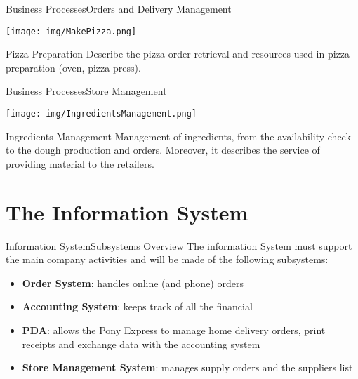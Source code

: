 \documentclass{beamer}
\begin{document}
\begin{frame}{Business Processes}{Orders and Delivery Management}
 \begin{center}
 \texttt{[image: img/MakePizza.png]}
\end{center}
  \begin{block}{Pizza Preparation}
   Describe the pizza order retrieval and resources used in pizza preparation (oven, pizza press).  
  \end{block}
\end{frame}

\begin{frame}{Business Processes}{Store Management}
  \begin{center}
 \texttt{[image: img/IngredientsManagement.png]}
\end{center}
  \begin{block}{Ingredients Management}
    Management of ingredients, from the availability check to the dough production and orders. Moreover, it describes the service of providing material to the retailers.
  \end{block}
\end{frame}


\section{The Information System}
\begin{frame}{Information System}{Subsystems Overview}
 The information System must support the main company activities and will be made of the following subsystems:
 \begin{itemize}
  \item \textbf{Order System}: handles online (and phone) orders
  \item \textbf{Accounting System}: keeps track of all the financial 
  \item \textbf{PDA}: allows the Pony Express to manage home delivery orders, print receipts and exchange data with the accounting system
  \item \textbf{Store Management System}: manages supply orders and the suppliers list
 \end{itemize}
\end{frame}
\end{document}
